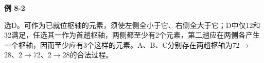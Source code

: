 {\color{ink}\bfseries 例 8-2}\par\vspace{1bp}选D。可作为已就位枢轴的元素，须使左侧全小于它、右侧全大于它；D中仅12和32满足，任选其一作为首趟枢轴，两侧都至少有2个元素，第二趟应在两侧各产生一个枢轴，因而至少应有3个这样的元素。A、B、C分别存在两趟枢轴为72\(\to \)28、2\(\to \)72、2\(\to \)28的合法过程。
